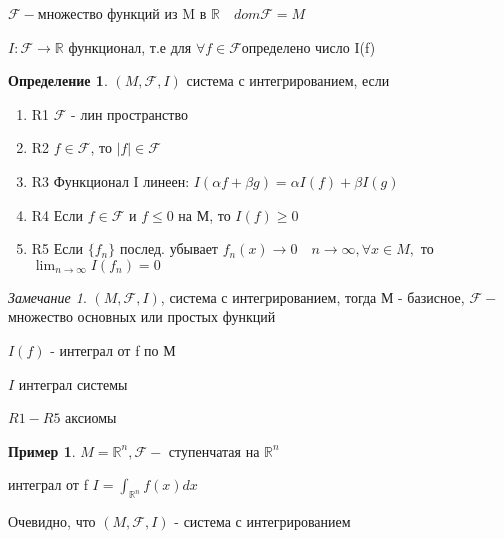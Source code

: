 \documentclass[a4paper, 12pt]{article}
\theoremstyle{definition}
\newtheorem*{example}{Пример}
\newtheorem*{definition}{Определение}
\theoremstyle{remark}
\newtheorem*{remark}{Замечание}
\begin{document}
$\mathcal{F} - $множество функций из M в $\mathbb{R} \quad dom{\mathcal{F} } = M$

$I:\mathcal{F} \to \mathbb{R} $ функционал, т.е для $\forall f\in \mathcal{F} $определено число I(f)
\begin{definition}
     $(M, \mathcal{F} , I)$ система с интегрированием, если
     \begin{enumerate}
          \item{R1} $\mathcal{F} $ - лин пространство
          \item{R2} $f\in\mathcal{F}$, то $|f|\in \mathcal{F} $
          \item{R3} Функционал I линеен: $I(\alpha f + \beta g) = \alpha I(f)+\beta I(g)$
          \item{R4} Если $f\in \mathcal{F} $ и $f\leq0$ на М, то $I(f)\geq0$
          \item{R5} Если $\{f_n\}$ послед. убывает $f_n(x)\to0\quad n\to\infty, \forall x\in M,$ то $\lim_{n\to\infty}I(f_n) = 0$ 
     \end{enumerate}
\end{definition}
\begin{remark}
     $(M, \mathcal{F} , I)$, система с интегрированием, тогда М - базисное, $\mathcal{F} -$ множество
     основных или простых функций

     $I(f)$ - интеграл от f по М

     $I$ интеграл системы
     
     $R1-R5$ аксиомы
\end{remark}
\begin{example}
     $M = \mathbb{R} ^n, \mathcal{F} -$ ступенчатая на $\mathbb{R} ^n$

     интеграл от f $I = \int_{\mathbb{R} ^n}f(x)dx$

     Очевидно, что $(M, \mathcal{F} , I)$ - система с интегрированием
\end{example}
\end{document}
